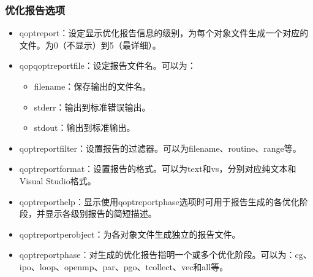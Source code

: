 \documentclass[a4paper,12pt,english]{sphinxmanual}
\begin{document}
\subsubsection{优化报告选项}
\label{\detokenize{compiler/intel:id6}}\begin{itemize}
\item {} 
\sphinxAtStartPar
\sphinxhyphen{}qopt\sphinxhyphen{}report\sphinxstyleemphasis{{[}=n{]}}：设定显示优化报告信息的级别，为每个对象文件生成一个对应的文件。为0（不显示）到5（最详细）。

\item {} 
\sphinxAtStartPar
\sphinxhyphen{}qopqopt\sphinxhyphen{}report\sphinxhyphen{}file：设定报告文件名。可以为：
\begin{itemize}
\item {} 
\sphinxAtStartPar
filename：保存输出的文件名。

\item {} 
\sphinxAtStartPar
stderr：输出到标准错误输出。

\item {} 
\sphinxAtStartPar
stdout：输出到标准输出。

\end{itemize}

\item {} 
\sphinxAtStartPar
\sphinxhyphen{}qopt\sphinxhyphen{}report\sphinxhyphen{}filter：设置报告的过滤器。可以为filename、routine、range等。

\item {} 
\sphinxAtStartPar
\sphinxhyphen{}qopt\sphinxhyphen{}report\sphinxhyphen{}format：设置报告的格式。可以为text和vs，分别对应纯文本和Visual Studio格式。

\item {} 
\sphinxAtStartPar
\sphinxhyphen{}qopt\sphinxhyphen{}report\sphinxhyphen{}help：显示使用\sphinxhyphen{}qopt\sphinxhyphen{}report\sphinxhyphen{}phase选项时可用于报告生成的各优化阶段，并显示各级别报告的简短描述。

\item {} 
\sphinxAtStartPar
\sphinxhyphen{}qopt\sphinxhyphen{}report\sphinxhyphen{}per\sphinxhyphen{}object：为各对象文件生成独立的报告文件。

\item {} 
\sphinxAtStartPar
\sphinxhyphen{}qopt\sphinxhyphen{}report\sphinxhyphen{}phase：对生成的优化报告指明一个或多个优化阶段。可以为：cg、ipo、loop、openmp、par、pgo、tcollect、vec和all等。


\end{itemize}
\end{document}
